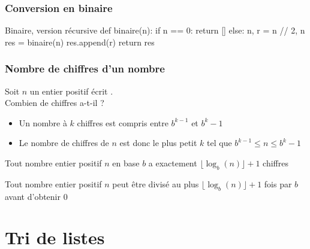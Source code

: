 \documentclass[12pt]{linfo-beamer}
\begin{document}
\begin{frame}[fragile]
  \frametitle{Conversion en binaire}

  \begin{pyframe}{Binaire, version récursive}
    def binaire(n):
        if n == 0:
            return []
        else:
            n, r = n // 2, n %
            res = binaire(n)
            res.append(r)
            return res
  \end{pyframe}
\end{frame}


\begin{frame}
  \frametitle{Nombre de chiffres d'un nombre}

  Soit $n$ un entier positif écrit .\\
  Combien de chiffres a-t-il ?
  \begin{itemize}
  \item Un nombre à $k$ chiffres est compris entre $b^{k-1}$ et ${b^k}-1$
  \item Le nombre de chiffres de $n$ est donc le plus petit $k$ tel que $b^{k-1} \leq n \leq {b^k}-1$
  \end{itemize}

  \vfill

  \begin{beamerboxesrounded}{}
   Tout nombre entier positif $n$ en base $b$ a
  exactement $\lfloor \log_{b}(n) \rfloor + 1$ chiffres
  \end{beamerboxesrounded}

  \pause
  \vfill

  \begin{beamerboxesrounded}{}
   Tout nombre entier positif $n$ peut être
  divisé au plus $\lfloor \log_{b}(n) \rfloor + 1$ fois par $b$ avant
  d'obtenir $0$
  \end{beamerboxesrounded}

\end{frame}


\section{Tri de listes}
\end{document}
